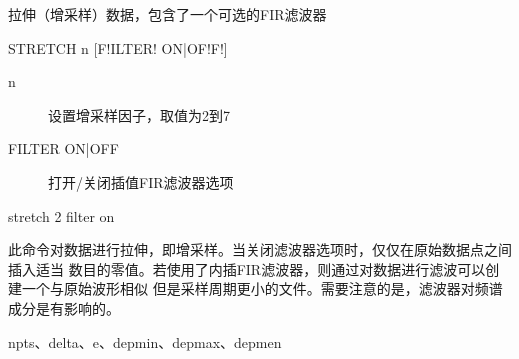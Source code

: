 \label{cmd:stretch}

拉伸（增采样）数据，包含了一个可选的FIR滤波器

\begin{SACSTX}
STRETCH  n [F!ILTER! ON|OF!F!]
\end{SACSTX}

\begin{description}
\item [n] 设置增采样因子，取值为2到7
\item [FILTER ON|OFF] 打开/关闭插值FIR滤波器选项
\end{description}

\begin{SACDFT}
stretch 2 filter on
\end{SACDFT}

此命令对数据进行拉伸，即增采样。当关闭滤波器选项时，仅仅在原始数据点之间插入适当
数目的零值。若使用了内插FIR滤波器，则通过对数据进行滤波可以创建一个与原始波形相似
但是采样周期更小的文件。需要注意的是，滤波器对频谱成分是有影响的。

npts、delta、e、depmin、depmax、depmen
